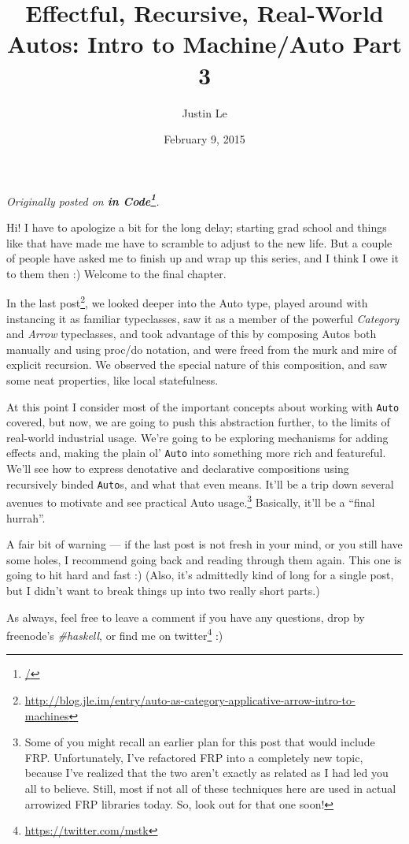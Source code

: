 \documentclass[]{article}
\title{Effectful, Recursive, Real-World Autos: Intro to Machine/Auto Part 3}
\author{Justin Le}
\date{February 9, 2015}
\renewcommand{\href}[2]{#2\footnote{\url{#1}}}
\begin{document}
\maketitle

\emph{Originally posted on \textbf{\href{/}{in Code}}.}

Hi! I have to apologize a bit for the long delay; starting grad school
and things like that have made me have to scramble to adjust to the new
life. But a couple of people have asked me to finish up and wrap up this
series, and I think I owe it to them then :) Welcome to the final
chapter.

In the
\href{http://blog.jle.im/entry/auto-as-category-applicative-arrow-intro-to-machines}{last
post}, we looked deeper into the Auto type, played around with
instancing it as familiar typeclasses, saw it as a member of the
powerful \emph{Category} and \emph{Arrow} typeclasses, and took
advantage of this by composing Autos both manually and using proc/do
notation, and were freed from the murk and mire of explicit recursion.
We observed the special nature of this composition, and saw some neat
properties, like local statefulness.

At this point I consider most of the important concepts about working
with \texttt{Auto} covered, but now, we are going to push this
abstraction further, to the limits of real-world industrial usage. We're
going to be exploring mechanisms for adding effects and, making the
plain ol' \texttt{Auto} into something more rich and featureful. We'll
see how to express denotative and declarative compositions using
recursively binded \texttt{Auto}s, and what that even means. It'll be a
trip down several avenues to motivate and see practical Auto
usage.\footnote{Some of you might recall an earlier plan for this post
  that would include FRP. Unfortunately, I've refactored FRP into a
  completely new topic, because I've realized that the two aren't
  exactly as related as I had led you all to believe. Still, most if not
  all of these techniques here are used in actual arrowized FRP
  libraries today. So, look out for that one soon!} Basically, it'll be
a ``final hurrah''.

A fair bit of warning --- if the last post is not fresh in your mind, or
you still have some holes, I recommend going back and reading through
them again. This one is going to hit hard and fast :) (Also, it's
admittedly kind of long for a single post, but I didn't want to break
things up into two really short parts.)

As always, feel free to leave a comment if you have any questions, drop
by freenode's \emph{\#haskell}, or find me on
\href{https://twitter.com/mstk}{twitter} :)
\end{document}
